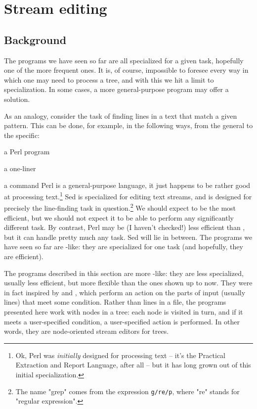 
\section[sct_ed]{Stream editing}


\subsection{Background}

The programs we have seen so far are all specialized for a given task,
hopefully one of the more frequent ones. It is, of course, impossible to
foresee every way in which one may need to process a tree, and with this we hit
a limit to specialization. In some cases, a more general-purpose program may
offer a solution.

As an analogy, consider the task of finding lines in a text that match a
given pattern. This can be done, for example, in the following ways, from the
general to the specific:
\startitemize
	\item a Perl program
	\item a  one-liner
	\item a  command
\stopitemize
Perl is a general-purpose language, it just happens to be rather good at
processing text.\footnote{Ok, Perl was {\em initially} designed for processing
text -- it's the Practical Extraction and Report Language, after all -- but it
has long grown out of this initial specialization.} Sed is specialized for
editing text streams, and  is designed for precisely the line-finding
task in question.\footnote{The name "grep" comes from the  expression
{\tt g/re/p}, where "re" stands for "regular expression".} We should expect
 to be the most efficient, but we should not expect it to be able to
perform any significantly different task.  By contrast, Perl may be (I haven't
checked!) less efficient than , but it can handle pretty much any
task. Sed will lie in between. The \nutils{} programs we have seen so far are
-like: they are specialized for one task (and hopefully, they are
efficient).

The programs described in this section are more -like: they are
less specialized, usually less efficient, but more flexible than the ones shown
up to now. They were in fact inspired by  and ,
which perform an action on the parts of input (usually lines) that meet some
condition. Rather than lines in a file, the programs presented here work with
nodes in a tree: each node is visited in turn, and if it meets a user-specified
condition, a user-specified action is performed. In other words, they are
node-oriented stream editors for trees.

